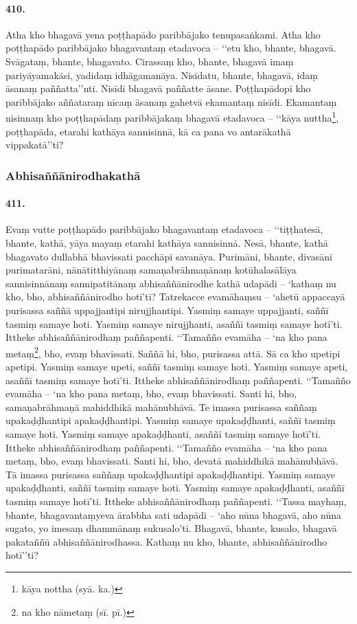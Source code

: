\paragraph{410.} Atha kho bhagavā yena poṭṭhapādo paribbājako tenupasaṅkami. Atha kho poṭṭhapādo paribbājako bhagavantaṃ etadavoca – ‘‘etu kho, bhante, bhagavā. Svāgataṃ, bhante, bhagavato. Cirassaṃ kho, bhante, bhagavā imaṃ pariyāyamakāsi, yadidaṃ idhāgamanāya. Nisīdatu, bhante, bhagavā, idaṃ āsanaṃ paññatta’’nti. Nisīdi bhagavā paññatte āsane. Poṭṭhapādopi kho paribbājako aññataraṃ nīcaṃ āsanaṃ gahetvā ekamantaṃ nisīdi. Ekamantaṃ nisinnaṃ kho poṭṭhapādaṃ paribbājakaṃ bhagavā etadavoca – ‘‘kāya nuttha\footnote{kāya nottha (syā. ka.)}, poṭṭhapāda, etarahi kathāya sannisinnā, kā ca pana vo antarākathā vippakatā’’ti?

\subsubsection{Abhisaññānirodhakathā}

\paragraph{411.} Evaṃ vutte poṭṭhapādo paribbājako bhagavantaṃ etadavoca – ‘‘tiṭṭhatesā, bhante, kathā, yāya mayaṃ etarahi kathāya sannisinnā. Nesā, bhante, kathā bhagavato dullabhā bhavissati pacchāpi savanāya. Purimāni, bhante, divasāni purimatarāni, nānātitthiyānaṃ samaṇabrāhmaṇānaṃ kotūhalasālāya sannisinnānaṃ sannipatitānaṃ abhisaññānirodhe kathā udapādi – ‘kathaṃ nu kho, bho, abhisaññānirodho hotī’ti? Tatrekacce evamāhaṃsu – ‘ahetū appaccayā purisassa saññā uppajjantipi nirujjhantipi. Yasmiṃ samaye uppajjanti, saññī tasmiṃ samaye hoti. Yasmiṃ samaye nirujjhanti, asaññī tasmiṃ samaye hotī’ti. Ittheke abhisaññānirodhaṃ paññapenti. ‘‘Tamañño evamāha – ‘na kho pana metaṃ\footnote{na kho nāmetaṃ (sī. pī.)}, bho, evaṃ bhavissati. Saññā hi, bho, purisassa attā. Sā ca kho upetipi apetipi. Yasmiṃ samaye upeti, saññī tasmiṃ samaye hoti. Yasmiṃ samaye apeti, asaññī tasmiṃ samaye hotī’ti. Ittheke abhisaññānirodhaṃ paññapenti. ‘‘Tamañño evamāha – ‘na kho pana metaṃ, bho, evaṃ bhavissati. Santi hi, bho, samaṇabrāhmaṇā mahiddhikā mahānubhāvā. Te imassa purisassa saññaṃ upakaḍḍhantipi apakaḍḍhantipi. Yasmiṃ samaye upakaḍḍhanti, saññī tasmiṃ samaye hoti. Yasmiṃ samaye apakaḍḍhanti, asaññī tasmiṃ samaye hotī’ti. Ittheke abhisaññānirodhaṃ paññapenti. ‘‘Tamañño evamāha – ‘na kho pana metaṃ, bho, evaṃ bhavissati. Santi hi, bho, devatā mahiddhikā mahānubhāvā. Tā imassa purisassa saññaṃ upakaḍḍhantipi apakaḍḍhantipi. Yasmiṃ samaye upakaḍḍhanti, saññī tasmiṃ samaye hoti. Yasmiṃ samaye apakaḍḍhanti, asaññī tasmiṃ samaye hotī’ti. Ittheke abhisaññānirodhaṃ paññapenti. ‘‘Tassa mayhaṃ, bhante, bhagavantaṃyeva ārabbha sati udapādi – ‘aho nūna bhagavā, aho nūna sugato, yo imesaṃ dhammānaṃ sukusalo’ti. Bhagavā, bhante, kusalo, bhagavā pakataññū abhisaññānirodhassa. Kathaṃ nu kho, bhante, abhisaññānirodho hotī’’ti?

